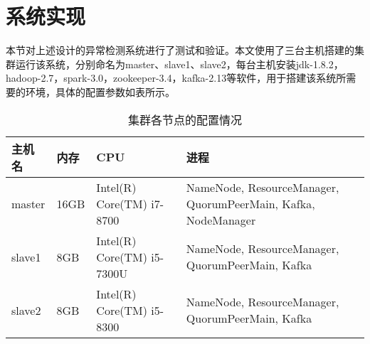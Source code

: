 





\section{系统实现}
本节对上述设计的异常检测系统进行了测试和验证。本文使用了三台主机搭建的集群运行该系统，分别命名为master、slave1、slave2，每台主机安装jdk-1.8.2，hadoop-2.7，spark-3.0，zookeeper-3.4，kafka-2.13等软件，用于搭建该系统所需要的环境，具体的配置参数如表所示。
\begin{table*}[h]
  \small
  \caption{集群各节点的配置情况}
  \label{集群各节点的配置情况}
  \centering
  \begin{tabular}{p{}<{\centering} p{}<{\centering} p{}<{\centering} p{}<{\centering}}
  \toprule
  主机名 & 内存 & CPU &  进程 \\
  
  \midrule
 master & 16GB & Intel(R) Core(TM) i7-8700 & NameNode, ResourceManager, QuorumPeerMain, Kafka, NodeManager \\
 slave1 & 8GB & Intel(R) Core(TM) i5-7300U & NameNode, ResourceManager, QuorumPeerMain, Kafka \\
 slave2 & 8GB & Intel(R) Core(TM) i5-8300 & NameNode, ResourceManager, QuorumPeerMain, Kafka \\
 
   \bottomrule
  
  \end{tabular}
  \end{table*}

